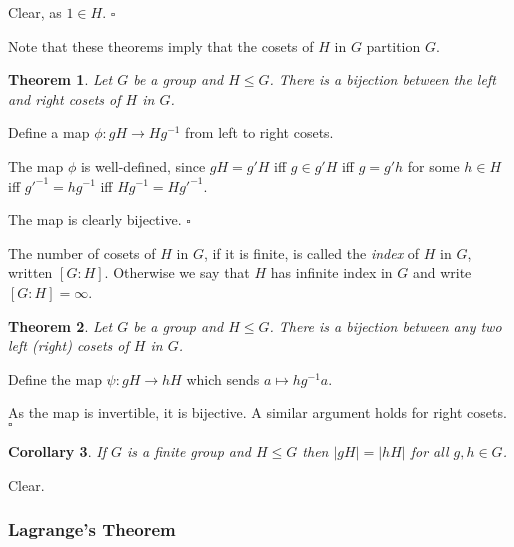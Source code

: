 \documentclass[10pt]{article}
\newtheorem{theorem}{Theorem}[section]
\newtheorem{corollary}[theorem]{Corollary}
\newenvironment{proof}[1][Proof]{\begin{trivlist}
\item[\hskip \labelsep {\itshape #1}]}{\end{trivlist}}
\newenvironment{definition}[1][Definition]{\begin{trivlist}
\item[\hskip \labelsep {\bfseries #1}]}{\end{trivlist}}
\begin{document}
\begin{proof}
Clear, as $1 \in H$. $\square$
\end{proof}

Note that these theorems imply that the cosets of $H$ in $G$ partition $G$.

\begin{theorem}
Let $G$ be a group and $H \leq G$. There is a bijection between the left and right cosets of $H$ in $G$.
\end{theorem}

\begin{proof}
Define a map $\phi : gH \to Hg^{-1}$ from left to right cosets.

The map $\phi$ is well-defined, since $gH = g'H$ iff $g \in g'H$ iff $g = g'h$ for some $h \in H$ iff $g'^{-1} = hg^{-1}$ iff $Hg^{-1} = Hg'^{-1}$.

The map is clearly bijective. $\square$
\end{proof}

\begin{definition}
The number of cosets of $H$ in $G$, if it is finite, is called the \emph{index} of $H$ in $G$, written $[G:H]$. Otherwise we say that $H$ has infinite index in $G$ and write $[G:H] = \infty$.
\end{definition}

\begin{theorem}
Let $G$ be a group and $H \leq G$. There is a bijection between any two left (right) cosets of $H$ in $G$.
\end{theorem}

\begin{proof}
Define the map $\psi : gH \to hH$ which sends $a \mapsto hg^{-1}a$.

As the map is invertible, it is bijective. A similar argument holds for right cosets. $\square$
\end{proof}

\begin{corollary} \label{cosetsize}
If $G$ is a finite group and $H \leq G$ then $|gH| = |hH|$ for all $g, h \in G$.
\end{corollary}

\begin{proof}
Clear.
\end{proof}

\subsubsection{Lagrange's Theorem}
\end{document}
